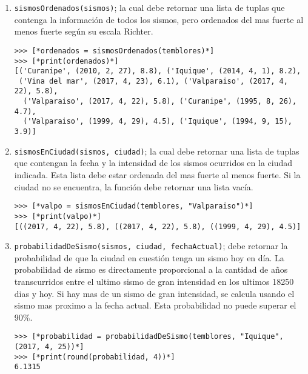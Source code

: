 \begin{enumerate}

\item \texttt{sismosOrdenados(sismos)}; la cual debe retornar una lista de tuplas que contenga la información de todos los sismos, pero ordenados del mas fuerte al menos fuerte según su escala Richter.

\begin{lstlisting}[style=consola]
>>> [*ordenados = sismosOrdenados(temblores)*]
>>> [*print(ordenados)*]
[('Curanipe', (2010, 2, 27), 8.8), ('Iquique', (2014, 4, 1), 8.2), 
 ('Vina del mar', (2017, 4, 23), 6.1), ('Valparaiso', (2017, 4, 22), 5.8), 
  ('Valparaiso', (2017, 4, 22), 5.8), ('Curanipe', (1995, 8, 26), 4.7), 
  ('Valparaiso', (1999, 4, 29), 4.5), ('Iquique', (1994, 9, 15), 3.9)]
\end{lstlisting}

\item \texttt{sismosEnCiudad(sismos, ciudad)}; la cual debe retornar una lista de tuplas que contengan la fecha y la intensidad de los sismos ocurridos en la ciudad indicada. Esta lista debe estar ordenada del mas fuerte al menos fuerte. Si la ciudad no se encuentra, la función debe retornar una lista vacía.

\begin{lstlisting}[style=consola]
>>> [*valpo = sismosEnCiudad(temblores, "Valparaiso")*]
>>> [*print(valpo)*]
[((2017, 4, 22), 5.8), ((2017, 4, 22), 5.8), ((1999, 4, 29), 4.5)]
\end{lstlisting}

\item \texttt{probabilidadDeSismo(sismos, ciudad, fechaActual)}; debe retornar la probabilidad de que la ciudad en cuestión tenga un sismo hoy en día. La probabilidad de sismo es directamente proporcional a la cantidad de años transcurridos entre el ultimo sismo de gran intensidad en los ultimos 18250 dias y hoy. Si hay mas de un sismo de gran intensidad, se calcula usando el sismo mas proximo a la fecha actual. Esta probabilidad no puede superar el 90\%.

\begin{lstlisting}[style=consola]
>>> [*probabilidad = probabilidadDeSismo(temblores, "Iquique", (2017, 4, 25))*]
>>> [*print(round(probabilidad, 4))*]
6.1315
\end{lstlisting}

\end{enumerate}

\newpage
